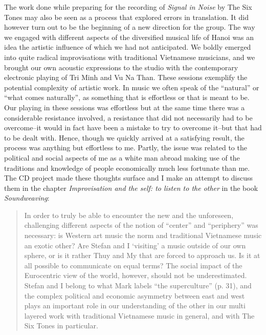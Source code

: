 \documentclass{article}
\begin{document}
The work done while preparing for the recording of \emph{Signal in Noise} by The Six Tones may also be seen as a process that explored errors in translation. It did however turn out to be the beginning of a new direction for the group. The way we engaged with different aspects of the diversified musical life of Hanoi was an idea the artistic influence of which we had not anticipated. We boldly emerged into quite radical improvisations with traditional Vietnamese musicians, and we brought our own acoustic expressions to the studio with the contemporary electronic playing of Tri Minh and Vu Na Than. These sessions exemplify the potential complexity of artistic work. In music we often speak of the ``natural'' or ``what comes naturally'', as something that is effortless or that is meant to be. Our playing in these sessions was effortless but at the same time there was a considerable resistance involved, a resistance that did not necessarily had to be overcome--it would in fact have been a mistake to try to overcome it--but that had to be dealt with. Hence, though we quickly arrived at a satisfying result, the process was anything but effortless to me. Partly, the issue was related to the political and social aspects of me as a white man abroad making use of the traditions and knowledge of people economically much less fortunate than me. The CD project made these thoughts surface and I make an attempt to discuss them in the chapter \emph{Improvisation and the self: to listen to the other} in the book \emph{Soundweaving}:

\begin{quote}
  In order to truly be able to encounter the new and the unforeseen,
  challenging different aspects of the notion of ``center'' and
  ``periphery'' was necessary: is Western art music the norm and
  traditional Vietnamese music an exotic other? Are Stefan and I
  `visiting' a music outside of our own sphere, or is it rather Thuy
  and My that are forced to approach us. Is it at all possible to
  communicate on equal terms? The social impact of the Eurocentric
  view of the world, however, should not be underestimated. Stefan and
  I belong to what Mark \citet{slobin1987} labels ``the superculture''
  (p. 31), and the complex political and economic asymmetry between
  east and west plays an important role in our understanding of the
  other in our multi layered work with traditional Vietnamese music in
  general, and with The Six Tones in particular. \citep{frisk12-improv}
\end{quote}
\end{document}
